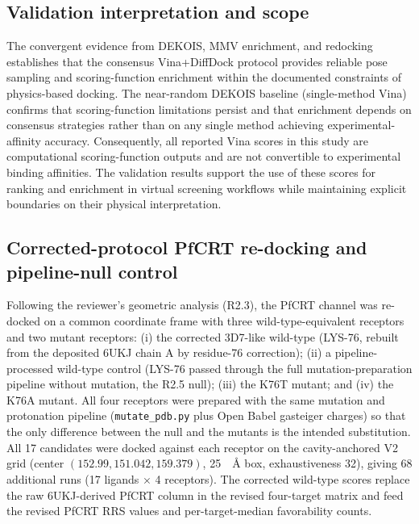 \documentclass[journal=jcisd8,manuscript=suppinfo]{achemso}
\begin{document}
\subsection{Validation interpretation and scope}\label{sec:sm_val_scope}
The convergent evidence from DEKOIS, MMV enrichment, and redocking establishes that the consensus Vina+DiffDock protocol provides reliable pose sampling and scoring-function enrichment within the documented constraints of physics-based docking. The near-random DEKOIS baseline (single-method Vina) confirms that scoring-function limitations persist and that enrichment depends on consensus strategies rather than on any single method achieving experimental-affinity accuracy. Consequently, all reported Vina scores in this study are computational scoring-function outputs and are not convertible to experimental binding affinities. The validation results support the use of these scores for ranking and enrichment in virtual screening workflows while maintaining explicit boundaries on their physical interpretation.

\subsection{Corrected-protocol PfCRT re-docking and pipeline-null control}\label{sec:sm_val_redock_null}
Following the reviewer's geometric analysis (R2.3), the PfCRT channel was re-docked on a common coordinate frame with three wild-type-equivalent receptors and two mutant receptors: (i) the corrected 3D7-like wild-type (LYS-76, rebuilt from the deposited 6UKJ chain A by residue-76 correction); (ii) a pipeline-processed wild-type control (LYS-76 passed through the full mutation-preparation pipeline without mutation, the R2.5 null); (iii) the K76T mutant; and (iv) the K76A mutant. All four receptors were prepared with the same mutation and protonation pipeline (\texttt{mutate\_pdb.py} plus Open Babel gasteiger charges) so that the only difference between the null and the mutants is the intended substitution. All \num{17} candidates were docked against each receptor on the cavity-anchored V2 grid (center $(\num{152.99}, \num{151.042}, \num{159.379})$, \num{25}~\SI{}{\angstrom} box, exhaustiveness \num{32}), giving \num{68} additional runs (\num{17} ligands $\times$ \num{4} receptors). The corrected wild-type scores replace the raw 6UKJ-derived PfCRT column in the revised four-target matrix and feed the revised PfCRT RRS values and per-target-median favorability counts.
\end{document}

